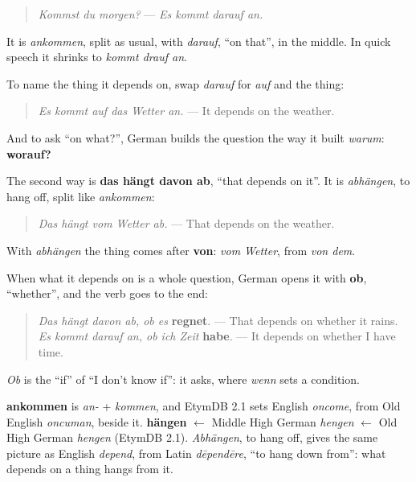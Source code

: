 \begin{quote}
\emph{Kommst du morgen?} — \emph{Es kommt darauf an.}
\end{quote}

It is \emph{ankommen}, split as usual, with \emph{darauf}, \textquotedblleft{}on that\textquotedblright{}, in the middle. In quick speech it shrinks to \emph{kommt drauf an}.

To name the thing it depends on, swap \emph{darauf} for \emph{auf} and the thing:

\begin{quote}
\emph{Es kommt auf das Wetter an.} — It depends on the weather.
\end{quote}

And to ask \textquotedblleft{}on what?\textquotedblright{}, German builds the question the way it built \emph{warum}: \textbf{worauf?}

\begin{grammarlens}[title={Grammar Lens: das hängt davon ab, ob …}]
The second way is \textbf{das hängt davon ab}, \textquotedblleft{}that depends on it\textquotedblright{}. It is \emph{abhängen}, to hang off, split like \emph{ankommen}:

\begin{quote}
\emph{Das hängt vom Wetter ab.} — That depends on the weather.
\end{quote}

With \emph{abhängen} the thing comes after \textbf{von}: \emph{vom Wetter}, from \emph{von dem}.

When what it depends on is a whole question, German opens it with \textbf{ob}, \textquotedblleft{}whether\textquotedblright{}, and the verb goes to the end:

\begin{quote}
\emph{Das hängt davon ab, ob es} \textbf{regnet}. — That depends on whether it rains. \emph{Es kommt darauf an, ob ich Zeit} \textbf{habe}. — It depends on whether I have time.
\end{quote}

\emph{Ob} is the \textquotedblleft{}if\textquotedblright{} of \textquotedblleft{}I don't know if\textquotedblright{}: it asks, where \emph{wenn} sets a condition.
\end{grammarlens}

\begin{cousinweb}
\textbf{ankommen} is \emph{an-} + \emph{kommen}, and EtymDB 2.1 sets English \emph{oncome}, from Old English \emph{oncuman}, beside it. \textbf{hängen} $\leftarrow$ Middle High German \emph{hengen} $\leftarrow$ Old High German \emph{hengen} (EtymDB 2.1). \emph{Abhängen}, to hang off, gives the same picture as English \emph{depend}, from Latin \emph{dēpendēre}, \textquotedblleft{}to hang down from\textquotedblright{}: what depends on a thing hangs from it.
\end{cousinweb}

